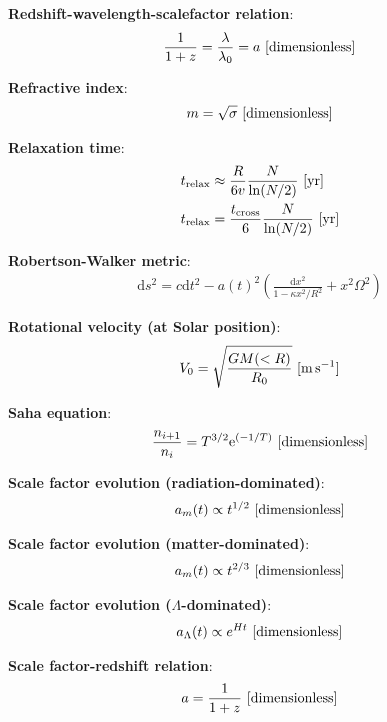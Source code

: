 \documentclass[a4paper,10pt]{article}
\begin{document}
{\noindent}\textbf{Redshift-wavelength-scalefactor relation}:
\begin{align*}
    \frac{1}{1+z} = \frac{\lambda}{\lambda_0} = a ~ [{\rm dimensionless}]
\end{align*}

{\noindent}\textbf{Refractive index}:
\begin{align*}
    m=\sqrt{\sigma} ~ [{\rm dimensionless}]
\end{align*}

{\noindent}\textbf{Relaxation time}:
\begin{align*}
    t_\mathrm{relax} &\approx \frac{R}{6v} \frac{N}{\ln(N/2)} ~ [{\rm yr}] \\
    t_\mathrm{relax} &= \frac{t_\mathrm{cross}}{6} \frac{N}{\ln(N/2)} ~ [{\rm yr}]
\end{align*}

{\noindent}\textbf{Robertson-Walker metric}:
\begin{align*}
    \mathrm{d}s^2 = c\mathrm{d}t^2 -a(t)^2 \left( \frac{\mathrm{d}x^2}{1-\kappa x^2/R^2} + x^2\Omega^2 \right)
\end{align*}

{\noindent}\textbf{Rotational velocity (at Solar position)}:
\begin{align*}
    V_0 = \sqrt{\frac{GM(<R)}{R_0}} ~ [{\rm m\,s^{-1}}]
\end{align*}

{\noindent}\textbf{Saha equation}:
\begin{align*}
    \frac{n_{i+1}}{n_i} = T^{3/2}\mathrm{e}^{(-1/T)} ~ [{\rm dimensionless}]
\end{align*}

{\noindent}\textbf{Scale factor evolution (radiation-dominated)}:
\begin{align*}
    a_m(t) \propto t^{1/2} ~ [{\rm dimensionless}]
\end{align*}

{\noindent}\textbf{Scale factor evolution (matter-dominated)}:
\begin{align*}
    a_m(t) \propto t^{2/3} ~ [{\rm dimensionless}]
\end{align*}

{\noindent}\textbf{Scale factor evolution ($\Lambda$-dominated)}:
\begin{align*}
    a_\Lambda(t) \propto e^{Ht} ~ [{\rm dimensionless}]
\end{align*}

{\noindent}\textbf{Scale factor-redshift relation}:
\begin{align*}
    a = \dfrac{1}{1+z} ~ [{\rm dimensionless}]
\end{align*}
\end{document}
